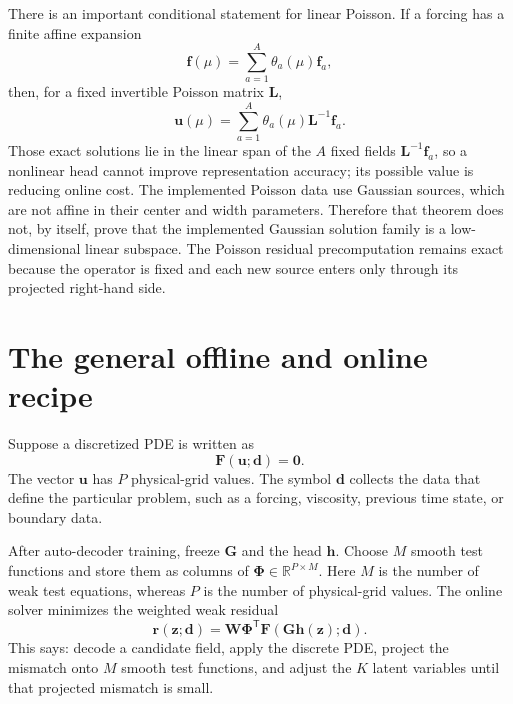 \documentclass[11pt]{article}
\newcommand{\mat}[1]{\mathbf{#1}}
\newcommand{\vect}[1]{\mathbf{#1}}
\begin{document}
There is an important conditional statement for linear Poisson.  If a forcing
has a finite affine expansion
\begin{equation}
  \vect{f}(\mu)=\sum_{a=1}^{A}\theta_a(\mu)\vect{f}_a,
\end{equation}
then, for a fixed invertible Poisson matrix $\mat{L}$,
\begin{equation}
  \vect{u}(\mu)
  =\sum_{a=1}^{A}\theta_a(\mu)\mat{L}^{-1}\vect{f}_a.
\end{equation}
Those exact solutions lie in the linear span of the $A$ fixed fields
$\mat{L}^{-1}\vect{f}_a$, so a nonlinear head cannot improve representation
accuracy; its possible value is reducing online cost.  The implemented
Poisson data use Gaussian sources, which are not affine in their center and
width parameters.  Therefore that theorem does not, by itself, prove that the
implemented Gaussian solution family is a low-dimensional linear subspace.
The Poisson residual precomputation remains exact because the operator is fixed
and each new source enters only through its projected right-hand side.

\section{The general offline and online recipe}

Suppose a discretized PDE is written as
\begin{equation}
  \vect{F}(\vect{u};\vect{d})=\vect{0}.
\end{equation}
The vector $\vect{u}$ has $P$ physical-grid values.  The symbol $\vect{d}$
collects the data that define the particular problem, such as a forcing,
viscosity, previous time state, or boundary data.

After auto-decoder training, freeze $\mat{G}$ and the head
$\vect{h}$.  Choose $M$ smooth test functions and store them as columns of
$\mat{\Phi}\in\mathbb{R}^{P\times M}$.  Here $M$ is the number of weak test
equations, whereas $P$ is the number of physical-grid values.  The online
solver minimizes the weighted weak residual
\begin{equation}
  \vect{r}(\vect{z};\vect{d})
  =\mat{W}\mat{\Phi}^{\mathsf T}
    \vect{F}\!\left(\mat{G}\vect{h}(\vect{z});\vect{d}\right).
\end{equation}
This says: decode a candidate field, apply the discrete PDE, project the
mismatch onto $M$ smooth test functions, and adjust the $K$ latent variables
until that projected mismatch is small.
\end{document}
